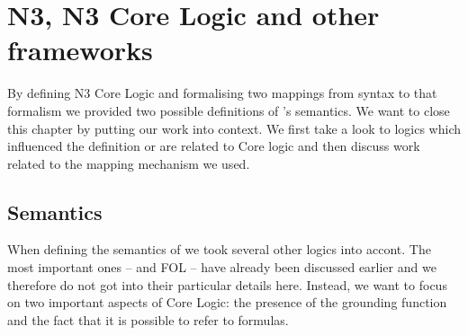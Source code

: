\section{N3, N3 Core Logic and other frameworks}\label{relwork} 
By defining N3 Core Logic and formalising two mappings from \nthree syntax to that formalism we provided two possible definitions of \nthree's semantics. 
We want to close this chapter by putting our work %
into context. We first take a look to logics which influenced the definition or are related to \nthree Core logic and then discuss work related to the mapping mechanism we used.
% 
% 
% 

\subsection{\nthree Semantics}
When defining the semantics of \nthree we took several other logics into accont. The most important ones -- \rdf and FOL -- have already been discussed earlier and
we therefore do not got into their particular details here. %
Instead, we want to focus on two important aspects of \nthree Core Logic: the presence of the grounding function and the fact that it is possible to refer to formulas.


